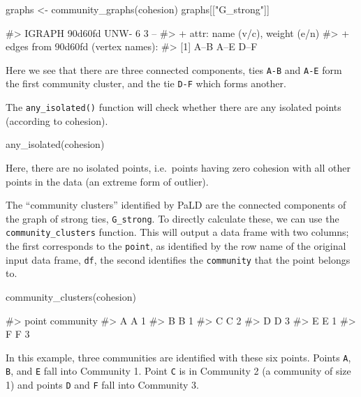 \begin{Schunk}
\begin{Sinput}
graphs <- community_graphs(cohesion)
graphs[["G_strong"]]
\end{Sinput}
\begin{Soutput}
#> IGRAPH 90d60fd UNW- 6 3 -- 
#> + attr: name (v/c), weight (e/n)
#> + edges from 90d60fd (vertex names):
#> [1] A--B A--E D--F
\end{Soutput}
\end{Schunk}

Here we see that there are three connected components, ties \texttt{A-B}
and \texttt{A-E} form the first community cluster, and the tie
\texttt{D-F} which forms another.

The \texttt{any\_isolated()} function will check whether there are any
isolated points (according to cohesion).

\begin{Schunk}
\begin{Sinput}
any_isolated(cohesion)
\end{Sinput}
\end{Schunk}

\noindent Here, there are no isolated points, i.e.~points having zero
cohesion with all other points in the data (an extreme form of outlier).

The ``community clusters'' identified by PaLD are the connected
components of the graph of strong ties, \texttt{G\_strong}. To directly
calculate these, we can use the \texttt{community\_clusters} function.
This will output a data frame with two columns; the first corresponds to
the \texttt{point}, as identified by the row name of the original input
data frame, \texttt{df}, the second identifies the \texttt{community}
that the point belongs to.

\begin{Schunk}
\begin{Sinput}
community_clusters(cohesion)
\end{Sinput}
\begin{Soutput}
#>   point community
#> A     A         1
#> B     B         1
#> C     C         2
#> D     D         3
#> E     E         1
#> F     F         3
\end{Soutput}
\end{Schunk}

In this example, three communities are identified with these six points.
Points \texttt{A}, \texttt{B}, and \texttt{E} fall into Community 1.
Point \texttt{C} is in Community 2 (a community of size 1) and points
\texttt{D} and \texttt{F} fall into Community 3.

